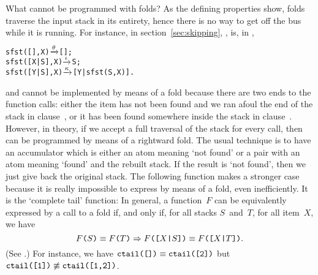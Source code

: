 What cannot be programmed with folds? As the defining properties show,
folds traverse the input stack in its entirety, hence there is no way
to get off the bus while it is running. For instance,  in
section~\ref{sec:skipping}, , is, in \Erlang,
\begin{alltt}
sfst(   [],X) \(\smashedrightarrow{\theta}\) [];
sfst([X|S],X) \(\smashedrightarrow{\iota}\) S;
sfst([Y|S],X) \(\smashedrightarrow{\kappa}\) [Y|sfst(S,X)].
\end{alltt}
and cannot be implemented by means of a fold because there are two
ends to the function calls: either the item has not been found and we
ran afoul the end of the stack in clause~\clause{\theta}, or it has
been found somewhere inside the stack in
clause~\clause{\iota}. However, in theory, if we accept a full
traversal of the stack for every call, then  can be
programmed by means of a rightward fold. The usual technique is to
have an accumulator which is either an atom meaning `not found' or a
pair with an atom meaning `found' and the rebuilt stack. If the result
is `not found', then we just give back the original stack. The
following function makes a stronger case because it is really
impossible to express by means of a fold, even inefficiently. It is
the `complete tail' function:\label{code:ctail}
 In general, a function~\(F\) can be
equivalently expressed by a call to a fold if, and only if, for all
stacks \(S\)~and~\(T\), for all item~\(X\), we have
\begin{equation*}
\texttt{\(F\)(\(S\))} \equiv \texttt{\(F\)(\(T\))}
\Rightarrow
\texttt{\(F\)([\(X\)|\(S\)])}
\equiv
\texttt{\(F\)([\(X\)|\(T\)])}.
\end{equation*}
(See \cite{GibbonsHuttonAltenkirch_2001,WeberCaldwell_2004}.) For
instance, we have \(\texttt{ctail([])} \equiv
\texttt{ctail([2])}\) but \(\texttt{ctail([1])} \mathrel{\not\equiv}
\texttt{ctail([1,2])}\).

